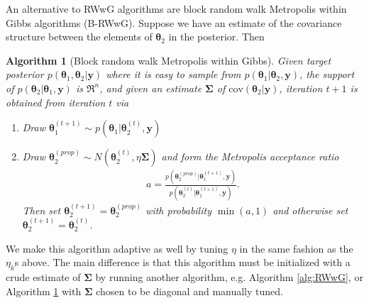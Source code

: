 \documentclass[12pt]{article}
\newtheorem{alg}{Algorithm}
\begin{document}
An alternative to RWwG algorithms are block random walk Metropolis within Gibbs algorithms (B-RWwG). Suppose we have an estimate of the covariance structure between the elements of $\bm{\theta}_2$ in the posterior. Then 
\begin{alg}[Block random walk Metropolis within Gibbs]\label{alg:B-RWwG}
Given target posterior $p(\bm{\theta}_1,\bm{\theta}_2|\bm{y})$ where it is easy to sample from $p(\bm{\theta}_1|\bm{\theta}_2,\bm{y})$, the support of $p(\bm{\theta}_{2}|\bm{\theta}_1,\bm{y})$ is $\Re^n$, and given an estimate $\bm{\Sigma}$ of $\mathrm{cov}(\bm{\theta}_2|\bm{y})$, iteration $t+1$ is obtained from iteration $t$ via
\begin{enumerate}
\item Draw $\bm{\theta}_1^{(t+1)} \sim p(\bm{\theta}_1|\bm{\theta}_2^{(t)},\bm{y})$
\item Draw $\bm{\theta}_{2}^{(prop)} \sim N(\bm{\theta}_{2}^{(t)}, \eta\bm{\Sigma})$ and form the Metropolis acceptance ratio
\begin{align*}
a = \frac{p(\bm{\theta}_{2}^{(prop)}|\bm{\theta}_1^{(t+1)},\bm{y})}{p(\bm{\theta}_{2}^{(t)}|\bm{\theta}_1^{(t+1)},\bm{y})}.
\end{align*}
Then set $\bm{\theta}_{2}^{(t+1)}=\bm{\theta}_{2}^{(prop)}$ with probability $\min(a,1)$ and otherwise set $\bm{\theta}_{2}^{(t+1)} = \bm{\theta}_{2}^{(t)}$.
\end{enumerate}
\end{alg}
We make this algorithm adaptive as well by tuning $\eta$ in the same fashion as the $\eta_k$s above. The main difference is that this algorithm must be initialized with a crude estimate of $\bm{\Sigma}$ by running another algorithm, e.g. Algorithm \ref{alg:RWwG}, or Algorithm \ref{alg:B-RWwG} with $\bm{\Sigma}$ chosen to be diagonal and manually tuned.

\clearpage\pagebreak\newpage\thispagestyle{empty}


\end{document}

